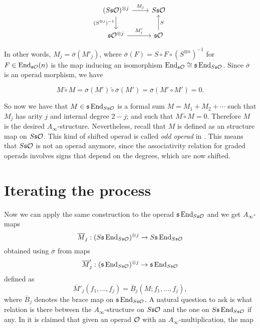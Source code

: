 \documentclass[twoside]{article}
\begin{document}
\[
\begin{tikzcd}
(S\s\OO)^{\otimes j}\arrow[r,"M_j"]\arrow[d, "(S^{\otimes j})^{-1}"'] & S\s\OO\\
\s\OO^{\otimes j}\arrow[r, "M'_j"] & \s\OO\arrow[u,"S"']
\end{tikzcd}
\]

In other words, $M_j=\overline{\sigma}(M'_j)$, where $\overline{\sigma}(F)=S\circ F\circ (S^{\otimes n})^{-1}$ for $F\in\operatorname{End}_{\mathfrak{s}{\mathcal O}}(n)$ is the map inducing an isomorphism $\operatorname{End}_{\mathfrak{s}{\mathcal O}}\cong \mathfrak{s}\operatorname{End}_{S\mathfrak{s}{\mathcal O}}$. Since $\overline{\sigma}$ is an operad morphism, we have

\[
M\tilde{\circ}M=\overline{\sigma}(M')\tilde{\circ}\overline{\sigma}(M')=\overline{\sigma}(M'\circ M')=0.
\]

So now we have that $M\in\mathfrak{s}\operatorname{End}_{S\mathfrak{s}{\mathcal O}}$ is a formal sum $M=M_1+M_2+\cdots$ such that $M_j$ has arity $j$ and internal degree $2-j$; and such that $M\tilde\circ M=0$. Therefore $M$ is the desired $A_\infty$-structure. Nevertheless, recall that $M$ is defined as an structure map on $S\mathfrak{s}{\mathcal O}$. This kind of shifted operad is called \emph{odd operad} in \cite{ward}. This means that $S\mathfrak{s}{\mathcal O}$ is not an operad anymore, since the associativity relation for graded operads involves signs that depend on the degrees, which are now shifted.

\section{Iterating the process}

Now we can apply the same construction to the operad $\mathfrak{s}\operatorname{End}_{S\mathfrak{s}{\mathcal O}}$ and we get $A_\infty$-maps 
\[\overline{M}_j:(S\mathfrak{s}\operatorname{End}_{S\mathfrak{s}{\mathcal O}})^{\otimes j}\to S\mathfrak{s}\operatorname{End}_{S\mathfrak{s}{\mathcal O}}\]
obtained using $\overline{\sigma}$ from maps
\[\overline{M}'_j:(\mathfrak{s}\operatorname{End}_{S\mathfrak{s}{\mathcal O}})^{\otimes j}\to \mathfrak{s}\operatorname{End}_{S\mathfrak{s}{\mathcal O}}\]
defined as
\[\overline{M}'_j(f_1,\dots,f_j)=\overline{B}_j(M;f_1,\dots, f_j),\]
where $\overline{B}_j$ denotes the brace map on $\mathfrak{s}\operatorname{End}_{S\mathfrak{s}{\mathcal O}}$. A natural question to ask is what relation is there between the $A_\infty$-structure on $S\mathfrak{s}{\mathcal O}$ and the one on $S\mathfrak{s}\operatorname{End}_{S\mathfrak{s}{\mathcal O}}$ if any. In \cite{GV} it is claimed that given an operad ${\mathcal O}$ with an $A_\infty$-multiplication, the map
\end{document}

